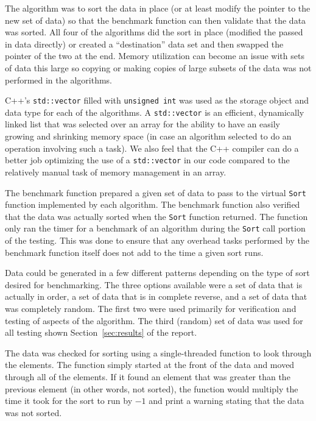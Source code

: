 \documentclass[journal]{IEEEtran}
\begin{document}
The algorithm was to sort the data in place (or at least modify the pointer to the new set of data) so that the benchmark function can then validate that the data was sorted. All four of the algorithms did the sort in place (modified the passed in data directly) or created a ``destination'' data set and then swapped the pointer of the two at the end. Memory utilization can become an issue with sets of data this large so copying or making copies of large subsets of the data was not performed in the algorithms.

C++'s \texttt{std::vector} filled with \texttt{unsigned int} was used as the storage object and data type for each of the algorithms. A \texttt{std::vector} is an efficient, dynamically linked list that was selected over an array for the ability to have an easily growing and shrinking memory space (in case an algorithm selected to do an operation involving such a task). We also feel that the C++ compiler can do a better job optimizing the use of a \texttt{std::vector} in our code compared to the relatively manual task of memory management in an array.

The benchmark function prepared a given set of data to pass to the virtual \texttt{Sort} function implemented by each algorithm. The benchmark function also verified that the data was actually sorted when the \texttt{Sort} function returned. The function only ran the timer for a benchmark of an algorithm during the \texttt{Sort} call portion of the testing. This was done to ensure that any overhead tasks performed by the benchmark function itself does not add to the time a given sort runs.

Data could be generated in a few different patterns depending on the type of sort desired for benchmarking. The three options available were a set of data that is actually in order, a set of data that is in complete reverse, and a set of data that was completely random. The first two were used primarily for verification and testing of aspects of the algorithm. The third (random) set of data was used for all testing shown Section~\ref{sec:results} of the report.

The data was checked for sorting using a single-threaded function to look through the elements. The function simply started at the front of the data and moved through all of the elements. If it found an element that was greater than the previous element (in other words, not sorted), the function would multiply the time it took for the sort to run by $-1$ and print a warning stating that the data was not sorted.
\end{document}
